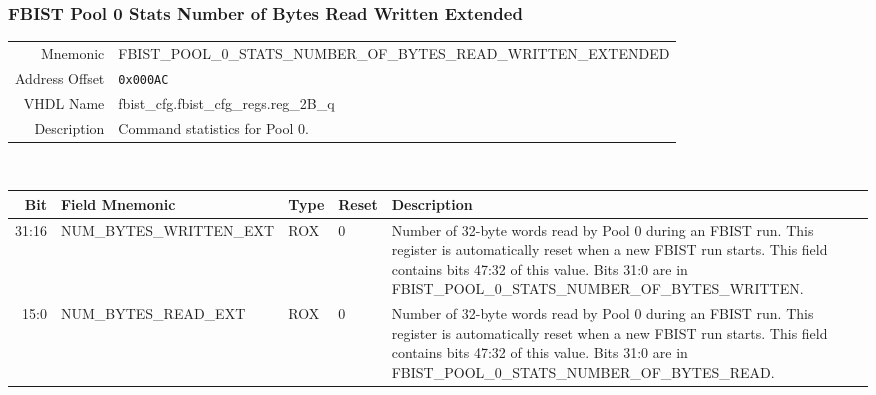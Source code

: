\subsubsection{FBIST Pool 0 Stats Number of Bytes Read Written Extended}
\begin{tabular}{ r | p{350px} }
  Mnemonic       & FBIST\_POOL\_0\_STATS\_NUMBER\_OF\_BYTES\_READ\_WRITTEN\_EXTENDED \\
  Address Offset & \texttt{0x000AC}                                                  \\
  VHDL Name      &  fbist\_cfg.fbist\_cfg\_regs.reg\_2B\_q                           \\ \hline

  Description &
  Command statistics for Pool 0. \\
\end{tabular}
\\
\begin{tabularx}{\textwidth}{r|l|l|l|X}
  \hline
  Bit   & Field Mnemonic           & Type & Reset & Description \\ \hline

  31:16 & NUM\_BYTES\_WRITTEN\_EXT & ROX  & 0     &

  Number of 32-byte words read by Pool 0 during an FBIST run. This
  register is automatically reset when a new FBIST run starts. This
  field contains bits 47:32 of this value. Bits 31:0 are in
  FBIST\_POOL\_0\_STATS\_NUMBER\_OF\_BYTES\_WRITTEN. \\

  15:0  & NUM\_BYTES\_READ\_EXT    & ROX  & 0     &

  Number of 32-byte words read by Pool 0 during an FBIST run. This
  register is automatically reset when a new FBIST run starts. This
  field contains bits 47:32 of this value. Bits 31:0 are in
  FBIST\_POOL\_0\_STATS\_NUMBER\_OF\_BYTES\_READ. \\
\end{tabularx}


